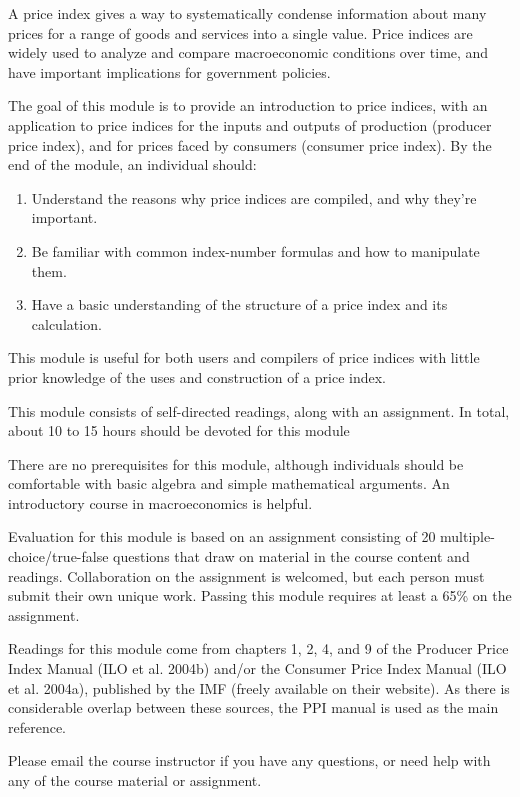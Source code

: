 \documentclass[]{article}
\begin{document}
A price index gives a way to systematically condense information about many prices for a range of goods and services into a single value. Price indices are widely used to analyze and compare macroeconomic conditions over time, and have important implications for government policies.

The goal of this module is to provide an introduction to price indices, with an application to price indices for the inputs and outputs of production (producer price index), and for prices faced by consumers (consumer price index). By the end of the module, an individual should:

\begin{enumerate}
\def\labelenumi{\arabic{enumi}.}
\item
  Understand the reasons why price indices are compiled, and why they're important.
\item
  Be familiar with common index-number formulas and how to manipulate them.
\item
  Have a basic understanding of the structure of a price index and its calculation.
\end{enumerate}

This module is useful for both users and compilers of price indices with little prior knowledge of the uses and construction of a price index.

This module consists of self-directed readings, along with an assignment. In total, about 10 to 15 hours should be devoted for this module

There are no prerequisites for this module, although individuals should be comfortable with basic algebra and simple mathematical arguments. An introductory course in macroeconomics is helpful.

Evaluation for this module is based on an assignment consisting of 20 multiple-choice/true-false questions that draw on material in the course content and readings. Collaboration on the assignment is welcomed, but each person must submit their own unique work. Passing this module requires at least a 65\% on the assignment.

Readings for this module come from chapters 1, 2, 4, and 9 of the Producer Price Index Manual (ILO et al. 2004b) and/or the Consumer Price Index Manual (ILO et al. 2004a), published by the IMF (freely available on their website). As there is considerable overlap between these sources, the PPI manual is used as the main reference.

Please email the course instructor if you have any questions, or need help with any of the course material or assignment.
\end{document}

